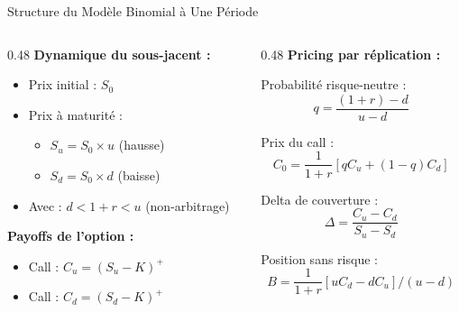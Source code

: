 \documentclass[aspectratio=169, 10pt]{beamer}
\begin{document}
\begin{frame}{Structure du Modèle Binomial à Une Période}
    \begin{columns}[T]
        \begin{column}{0.48\textwidth}
            \textbf{Dynamique du sous-jacent :}
            \begin{itemize}
                \item Prix initial : $S_0$
                \item Prix à maturité :
                \begin{itemize}
                    \item $S_u = S_0 \times u$ (hausse)
                    \item $S_d = S_0 \times d$ (baisse)
                \end{itemize}
                \item Avec : $d < 1+r < u$ (non-arbitrage)
            \end{itemize}
            
            \vspace{0.3cm}
            \textbf{Payoffs de l'option :}
            \begin{itemize}
                \item Call : $C_u = (S_u - K)^+$
                \item Call : $C_d = (S_d - K)^+$
            \end{itemize}
        \end{column}
        \begin{column}{0.48\textwidth}
            \textbf{Pricing par réplication :}
            
            Probabilité risque-neutre :
            $$q = \frac{(1+r) - d}{u - d}$$
            
            Prix du call :
            $$C_0 = \frac{1}{1+r}\left[q C_u + (1-q) C_d\right]$$
            
            Delta de couverture :
            $$\Delta = \frac{C_u - C_d}{S_u - S_d}$$
            
            Position sans risque :
            $$B = \frac{1}{1+r}\left[u C_d - d C_u\right] / (u-d)$$
        \end{column}
    \end{columns}
\end{frame}
\end{document}
